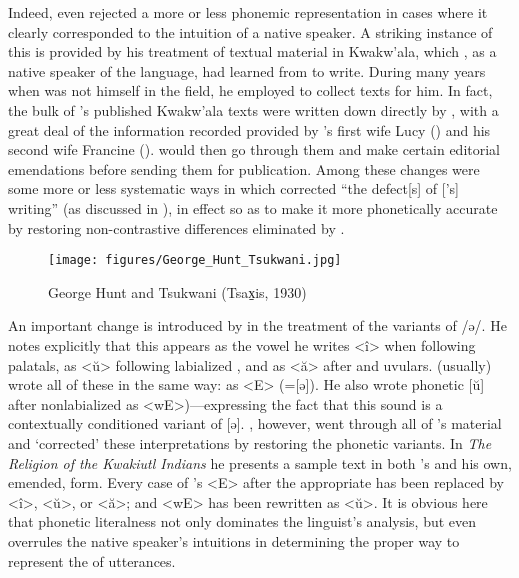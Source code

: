 Indeed, {\Boas} even rejected a more or less phonemic representation in
cases where it clearly corresponded to the intuition of a native
speaker. A striking instance of this is provided by his treatment of
textual material in Kwakw'ala, which , as a native speaker
of the language, had learned from {\Boas} to write. During many years
when {\Boas} was not himself in the field, he employed {\Hunt} to collect
texts for him. In fact, the bulk of {\Boas}'s published Kwakw'ala texts
were written down directly by {\Hunt}, with a great deal of the
information recorded provided by {\Hunt}'s first wife Lucy ({\HuntL})
and his second wife Francine ({\HuntF}). {\Boas} would then go through
them and make certain editorial emendations before sending them for
publication. Among these changes were some more or less systematic
ways in which {\Boas} corrected ``the defect[s] of [{\Hunt}'s] writing'' (as
discussed in \citealt[xi. ff.]{boas30:religion}), in effect so as to make it more
phonetically accurate by restoring non-contrastive differences
eliminated by {\Hunt}.

\begin{wrapfigure}{r}{.5\textwidth}
  \texttt{[image: figures/George\_Hunt\_Tsukwani.jpg]}
  \caption{George Hunt and Tsukwani (Tsax̠is, 1930)
  }
  \label{fig:ch.boas.hunt_tsukwani}
\end{wrapfigure}
An important {change} is introduced by {\Boas} in the treatment of the
variants of /ə/. He notes explicitly that this appears as the vowel he
writes <î> when following palatals, as <ŭ> following labialized
, and as <ă> after  and uvulars. {\Hunt} (usually)
wrote all of these in the same way: as <{\footnotesize E}> (=[ə]). He
also wrote phonetic [ŭ] after nonlabialized  as
<w{\footnotesize E}>)—expressing the fact that this sound is a
contextually conditioned variant of [ə]. {\Boas}, however, went through
all of {\Hunt}'s material and `corrected' these interpretations by
restoring the phonetic variants. In \textsl{The Religion of the
  Kwakiutl Indians} \citep[xiv--xviii]{boas30:religion} he presents a
sample text in both {\Hunt}'s and his own, emended, form. Every case of
{\Hunt}'s <{\footnotesize E}> after the appropriate  has been
replaced by <î>, <ŭ>, or <ă>; and <w{\footnotesize E}> has been
rewritten as <ŭ>. It is obvious here that phonetic literalness not
only dominates the linguist's analysis, but even overrules the native
speaker's intuitions in determining the proper way to represent the
 of utterances.

